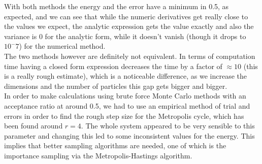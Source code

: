\documentclass[10pt,a4paper,titlepage]{article}
\begin{document}
With both methods the energy and the error have a minimum in 0.5, as expected, and we can see that while the numeric derivatives get really close to the values we expect, the analytic expression gets the value exactly and also the variance is 0 for the analytic form, while it doesn't vanish (though it drops to $10^-7$) for the numerical method.\\
The two methods however are definitely not equivalent. In terms of computation time having a closed form expression decreases the time by a factor of $\approx 10$ (this is a really rough estimate), which is a noticeable difference, as we increase the dimensions and the number of particles this gap gets bigger and bigger. \\
In order to make calculations using brute force Monte Carlo methods with an acceptance ratio at around 0.5, we had to use an empirical method of trial and errors in order to find the rough step size for the Metropolis cycle, which has been found around $r=4$. The whole system appeared to be very sensible to this parameter and changing this led to some inconsistent values for the energy. This implies that better sampling algorithms are needed, one of which is the importance sampling via the Metropolis-Hastings algorithm.
\end{document}
